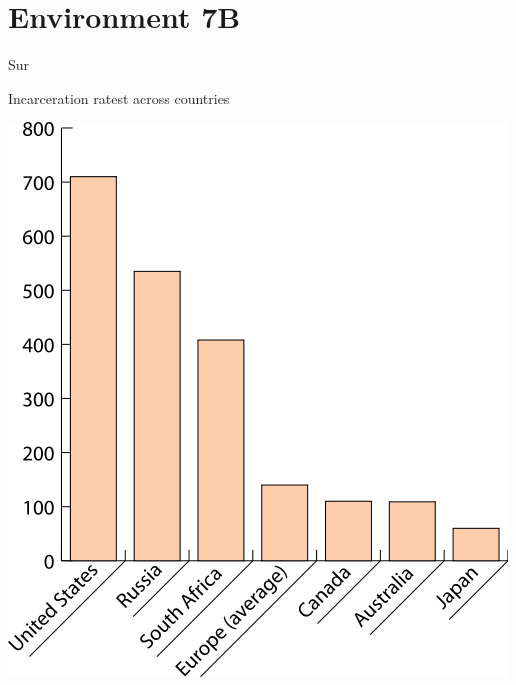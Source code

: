 
\section{Environment 7B}

\begin{chart}{S}{ur}
\caption{Incarceration ratest across countries}
\label{chart:incarceration}
\includegraphics[width=\chartwidth,height=\chartheight]{incarceration}  
\end{chart}

